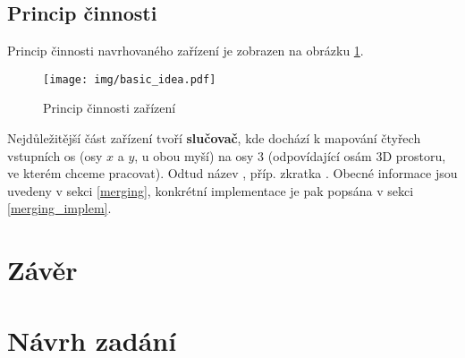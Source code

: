 \documentclass[a4paper,12pt,titlepage]{article}
\begin{document}
\subsection{Princip činnosti}

Princip činnosti navrhovaného zařízení je zobrazen na obrázku \ref{fig:basicidea}.

\begin{figure}[htb]
\centering
\texttt{[image: img/basic\_idea.pdf]}
\caption{Princip činnosti zařízení}
\label{fig:basicidea}
\end{figure}

Nejdůležitější část zařízení tvoří {\bf slučovač}, kde dochází k mapování
čtyřech vstupních os (osy $x$ a $y$, u obou myší) na osy 3 (odpovídající
osám 3D prostoru, ve kterém chceme pracovat). Odtud název , příp.
zkratka .
Obecné informace jsou uvedeny v sekci \ref{merging}, konkrétní implementace
je pak popsána v sekci \ref{merging_implem}.


\clearpage





\section{Závěr}\label{conclusion}

\newpage

\appendix

\section{Návrh zadání}\label{zadani}
\end{document}
